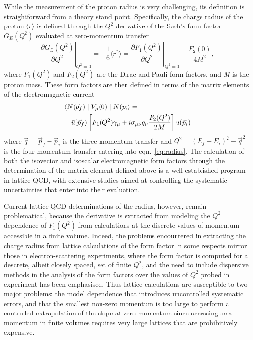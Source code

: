 \documentclass[prd,aps,twocolumn,superscriptaddress,tightenlines,nofootinbib,floatfix,preprintnumbers,10pt]{revtex4-1}
\begin{document}
While the measurement of the proton radius is very challenging, its
definition is straightforward from a theory stand point. Specifically,
the charge radius of the proton $\langle r \rangle$ is defined through the $Q^2$
derivative of the Sach's form factor $G_E(Q^2)$
evaluated at zero-momentum transfer
\begin{equation}
  \left. \frac{\partial G_E(Q^2)}{\partial Q^2} \right|_{Q^2=0} = -\frac{1}{6}
    \langle r^2 \rangle = \left. \frac{\partial F_1(Q^2)}{\partial
      Q^2}\right|_{Q^2=0} - \frac{F_2(0)}{4 M^2},\label{eq:radius}
\end{equation}
where $F_1(Q^2)$ and $F_2(Q^2)$ are the Dirac and Pauli form factors,
and $M$ is the proton mass.
These form factors are then defined in terms of the matrix elements of
the electromagnetic current
\begin{eqnarray}
\lefteqn{\langle N(\vec{p}_f) \mid V_{\mu}(0) \mid N(\vec{p}_i \rangle
  =} \nonumber \\
& &  \bar{u}(\vec{p}_f) \left[ F_1(Q^2) \gamma_\mu + i\sigma_{\mu\nu}
    q_\nu \frac{F_2(Q^2)}{2 M} \right] u(\vec{p}_i)
\label{eq:VmuME}
\end{eqnarray}
where $\vec{q} = \vec{p}_f - \vec{p}_i$ is the three-momentum transfer
and $Q^2 = (E_f - E_i)^2 - \vec{q}^2$ is the four-momentum transfer
entering into eqn.~\ref{eq:radius}.  The calculation of both the
isovector and isoscalar electromagnetic form factors through the
determination of the matrix element defined above is a
well-established program in lattice QCD, with extensive studies aimed
at controlling the systematic uncertainties that enter into their
evaluation.

Current lattice QCD determinations of the radius, however, remain
problematical, because the derivative is extracted from modeling the
$Q^2$ dependence of $F_1(Q^2)$ from calculations at the discrete
values of momentum accessible in a finite volume.  Indeed, the
problems encountered in extracting the charge radius from lattice
calculations of the form factor in some respects mirror those in
electron-scattering experiments, where the form factor is computed for
a descrete, albeit closely spaced, set of finite $Q^2$, and the need
to include dispersive methods in the analysis of the form factors over
the values of $Q^2$ probed in experiment has been
emphasised\cite{Alarcon:2018irp}.  Thus lattice calculations are
susceptible to two major problems: the model dependence that
introduces uncontrolled systematic errors, and that the smallest
non-zero momentum is too large to perform a controlled extrapolation
of the slope at zero-momentum since accessing small momentum in finite
volumes requires very large lattices that are prohibitively expensive.
\end{document}

